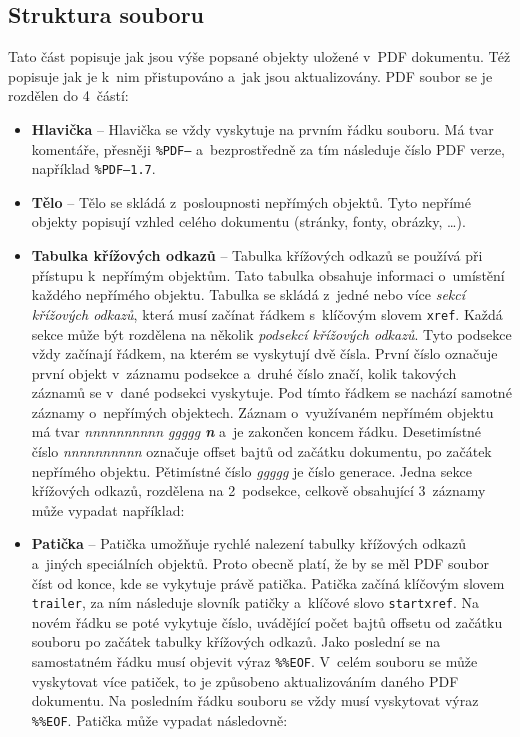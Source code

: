 \subsection*{Struktura souboru}
Tato část popisuje jak jsou výše popsané objekty uložené v~PDF dokumentu.
Též popisuje jak je k~nim přistupováno a~jak jsou aktualizovány.
PDF soubor se je rozdělen do 4~částí: 
\begin{itemize}
    \item \textbf{Hlavička} -- Hlavička se vždy vyskytuje na prvním řádku souboru.
    Má tvar komentáře, přesněji \texttt{\%PDF–} a~bezprostředně za tím následuje
    číslo PDF verze, například \texttt{\%PDF–1.7}.
    
    \item \textbf{Tělo} -- Tělo se skládá z~posloupnosti nepřímých objektů. Tyto 
    nepřímé objekty popisují vzhled celého dokumentu (stránky, fonty, obrázky,
    \ldots).
    
    \item \textbf{Tabulka křížových odkazů} -- Tabulka křížových odkazů se používá
    při přístupu k~nepřímým objektům. Tato tabulka obsahuje informaci o~umístění
    každého nepřímého objektu. Tabulka se skládá z~jedné nebo více \emph{sekcí
    křížových odkazů}, která musí začínat řádkem s~klíčovým slovem \texttt{xref}.
    Každá sekce může být rozdělena na několik \emph{podsekcí křížových odkazů}.
    Tyto podsekce vždy začínají řádkem, na kterém se vyskytují dvě čísla. První
    číslo označuje první objekt v~záznamu podsekce a~druhé číslo značí, kolik
    takových záznamů se v~dané podsekci vyskytuje. Pod tímto řádkem se nachází
    samotné záznamy o~nepřímých objektech. Záznam o~využívaném nepřímém objektu
    má tvar \emph{nnnnnnnnnn ggggg \textbf{n}} a~je zakončen koncem řádku.
    Desetimístné číslo \emph{nnnnnnnnnn} označuje offset bajtů od začátku
    dokumentu, po začátek nepřímého objektu. Pětimístné číslo \emph{ggggg} je
    číslo generace. Jedna sekce křížových odkazů, rozdělena na 2~podsekce, celkově
    obsahující 3~záznamy může vypadat například:
    
    \item \textbf{Patička} -- Patička umožňuje rychlé nalezení tabulky křížových
    odkazů a~jiných speciálních objektů. Proto obecně platí, že by se měl PDF
    soubor číst od konce, kde se vykytuje právě patička. Patička začíná klíčovým
    slovem \texttt{trailer}, za ním následuje slovník patičky a~klíčové slovo
    \texttt{startxref}. Na novém řádku se poté vykytuje číslo, uvádějící počet
    bajtů offsetu od začátku souboru po začátek tabulky křížových odkazů. Jako
    poslední se na samostatném řádku musí objevit výraz \texttt{\%\%EOF}.
    V~celém souboru se může vyskytovat více patiček, to je způsobeno aktualizováním
    daného PDF dokumentu. Na posledním řádku souboru se vždy musí vyskytovat
    výraz \texttt{\%\%EOF}. Patička může vypadat následovně:

\end{itemize}

